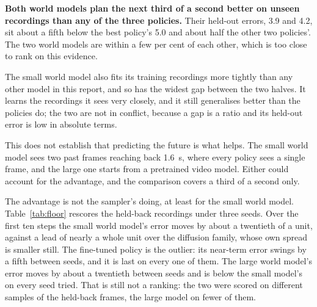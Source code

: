 \begin{table}[t]
  \centering
  \caption{Action error over the first ten planned steps, about a third of a
  second, for every family. \emph{Horizon} is how far each model plans in
  total; the error is computed over the ten steps they all plan. \emph{Gap} is
  held-out error divided by trained-on error. The large world model was scored
  on one frame in sixty and the others on one in twenty-five.}
  \label{tab:worldactions}
  \small
  
\end{table}

\textbf{Both world models plan the next third of a second better on unseen
recordings than any of the three policies.} Their held-out errors, \num{3.9}
and \num{4.2}, sit about a fifth below the best policy's \num{5.0} and about
half the other two policies'. The two world models are within a few per cent
of each other, which is too close to rank on this evidence.

The small world model also fits its training recordings more tightly than any
other model in this report, and so has the widest gap between the two halves.
It learns the recordings it sees very closely, and it still generalises better
than the policies do; the two are not in conflict, because a gap is a ratio and
its held-out error is low in absolute terms.

This does not establish that predicting the future is what helps. The small
world model sees two past frames reaching back \SI{1.6}{\second}, where
every policy sees a single frame, and the large one starts from a pretrained video model. Either
could account for the advantage, and the comparison covers a third of a
second only.

\begin{table}[t]
  \centering
  \caption{The sampler's own spread. The held-back recordings scored three
  times, changing only the random seed each sampling model draws from; the
  lowest and highest root-mean-square error are shown. A difference between
  two models smaller than this spread is not a finding. The large world
  model's own-horizon and ten-step columns coincide because it plans ten
  steps. Its row in Table~\ref{tab:worldactions} was drawn with the model's
  built-in default seed, which gave a higher error than any of these three.}
  \label{tab:floor}
  \small
  
\end{table}

The advantage is not the sampler's doing, at least for the small world model.
Table~\ref{tab:floor} rescores the held-back recordings under three seeds.
Over the first ten steps the small world model's error moves by about a
twentieth of a unit, against a lead of nearly a whole unit over the diffusion
family, whose own spread is smaller still. The fine-tuned policy is the
outlier: its near-term error swings by a fifth between seeds, and it is last
on every one of them. The large world model's error moves by about a twentieth
between seeds and is below the small model's on every seed tried. That is still
not a ranking: the two were scored on different samples of the held-back
frames, the large model on fewer of them.
